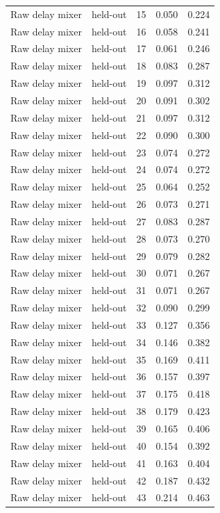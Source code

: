 \begin{tabular}{llrrr}
Raw delay mixer & held-out & 15 & 0.050 & 0.224 \\
Raw delay mixer & held-out & 16 & 0.058 & 0.241 \\
Raw delay mixer & held-out & 17 & 0.061 & 0.246 \\
Raw delay mixer & held-out & 18 & 0.083 & 0.287 \\
Raw delay mixer & held-out & 19 & 0.097 & 0.312 \\
Raw delay mixer & held-out & 20 & 0.091 & 0.302 \\
Raw delay mixer & held-out & 21 & 0.097 & 0.312 \\
Raw delay mixer & held-out & 22 & 0.090 & 0.300 \\
Raw delay mixer & held-out & 23 & 0.074 & 0.272 \\
Raw delay mixer & held-out & 24 & 0.074 & 0.272 \\
Raw delay mixer & held-out & 25 & 0.064 & 0.252 \\
Raw delay mixer & held-out & 26 & 0.073 & 0.271 \\
Raw delay mixer & held-out & 27 & 0.083 & 0.287 \\
Raw delay mixer & held-out & 28 & 0.073 & 0.270 \\
Raw delay mixer & held-out & 29 & 0.079 & 0.282 \\
Raw delay mixer & held-out & 30 & 0.071 & 0.267 \\
Raw delay mixer & held-out & 31 & 0.071 & 0.267 \\
Raw delay mixer & held-out & 32 & 0.090 & 0.299 \\
Raw delay mixer & held-out & 33 & 0.127 & 0.356 \\
Raw delay mixer & held-out & 34 & 0.146 & 0.382 \\
Raw delay mixer & held-out & 35 & 0.169 & 0.411 \\
Raw delay mixer & held-out & 36 & 0.157 & 0.397 \\
Raw delay mixer & held-out & 37 & 0.175 & 0.418 \\
Raw delay mixer & held-out & 38 & 0.179 & 0.423 \\
Raw delay mixer & held-out & 39 & 0.165 & 0.406 \\
Raw delay mixer & held-out & 40 & 0.154 & 0.392 \\
Raw delay mixer & held-out & 41 & 0.163 & 0.404 \\
Raw delay mixer & held-out & 42 & 0.187 & 0.432 \\
Raw delay mixer & held-out & 43 & 0.214 & 0.463 \\

\end{tabular}
